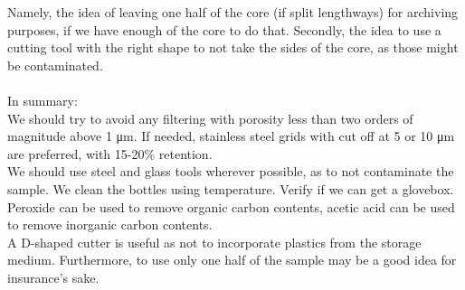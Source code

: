 \documentclass[twocolumn,a4paper,aps,amsmath,amssymb,floatfix,superscriptaddress]{revtex4-2}
\begin{document}
	Namely, the idea of leaving one half of the core (if split lengthways) for archiving purposes, if we have enough of the core to do that. Secondly, the idea to use a cutting tool with the right shape to not take the sides of the core, as those might be contaminated.\\
	\\
	In summary:\\
	We should try to avoid any filtering with porosity less than two orders of magnitude above 1 μm. If needed, stainless steel grids with cut off at 5 or 10 μm are preferred, with 15-20\% retention.\\
	We should use steel and glass tools wherever possible, as to not contaminate the sample.
	We clean the bottles using temperature. Verify if we can get a glovebox.\\
	Peroxide can be used to remove organic carbon contents, acetic acid can be used to remove inorganic carbon contents.\\
	A D-shaped cutter is useful as not to incorporate plastics from the storage medium. Furthermore, to use only one half of the sample may be a good idea for insurance's sake.
\end{document}
